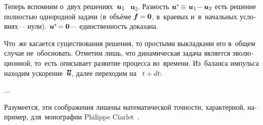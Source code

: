 \begin{otherlanguage}{russian}
\vspace{-0.2em}
Теперь вспомним о~двух решениях~${\bm{u}_1\hspace{-0.25ex}}$ ~${\bm{u}_2}$.
Разность ${\bm{u}^{\hspace{-0.1ex}*} \hspace{-0.25ex} \equiv \hspace{.1ex} \bm{u}_1 \hspace{-0.36ex} - \bm{u}_2}$ есть решение полностью однородной задачи (в~объёме ${\bm{f} \hspace{-0.1ex} = \bm{0}}$, в~краевых и~в~начальных условиях\:--- нули).
 ${\bm{u}^{\hspace{-0.1ex}*} \hspace{-0.32ex} = \bm{0}}$\:--- единственность доказана.

Что~же касается существования решения, то простыми выкладками его в~общем случае не~обосновать.
Отметим лишь, что динамическая задача является эволюционной, то~есть описывает развитие процесса во~времени.
Из~баланса импульса находим ускорение~$\mathdotdotabove{\bm{u}}$, далее переходим на~ ${t + dt}$:

...


Разумеется, эти соображения лишены математической точности, характерной, например, для~монографии Philippe Ciarlet~\cite{ciarlet-mathematicalelasticity}.

\end{otherlanguage}



\label{para:hookelaw}

